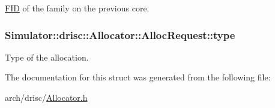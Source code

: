 \hyperlink{struct_simulator_1_1_f_i_d}{F\+I\+D} of the family on the previous core. 

\hypertarget{struct_simulator_1_1drisc_1_1_allocator_1_1_alloc_request_a627f11c7a81aaf352cf2414886b9fda9}{
\subsubsection[{type}]{ Simulator\+::drisc\+::\+Allocator\+::\+Alloc\+Request\+::type}}\label{struct_simulator_1_1drisc_1_1_allocator_1_1_alloc_request_a627f11c7a81aaf352cf2414886b9fda9}


Type of the allocation. 



The documentation for this struct was generated from the following file\+:\begin{DoxyCompactItemize}
\item 
arch/drisc/\hyperlink{_allocator_8h}{Allocator.\+h}\end{DoxyCompactItemize}
